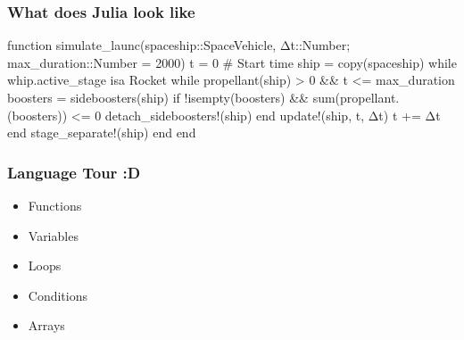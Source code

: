 \documentclass[compress,aspectratio=169]{beamer}
\begin{document}
\begin{frame}[fragile] %
    \frametitle{What does Julia look like}
    \begin{jllisting}[gobble=8]
        function simulate_launc(spaceship::SpaceVehicle, Δt::Number; max_duration::Number = 2000)
            t = 0  # Start time
            ship = copy(spaceship)
            while whip.active_stage isa Rocket
                while propellant(ship) > 0 && t <= max_duration
                    boosters = sideboosters(ship)
                    if !isempty(boosters) && sum(propellant.(boosters)) <= 0
                        detach_sideboosters!(ship)
                    end
                    update!(ship, t, Δt)
                    t += Δt
                end
                stage_separate!(ship)
            end
        end
    \end{jllisting}
\end{frame} 


\begin{frame} %
    \frametitle{Language Tour :D}

    \begin{itemize}
        \item Functions
        \item Variables
        \item Loops
        \item Conditions
        \item Arrays
    \end{itemize}
\end{frame} %
\end{document}
